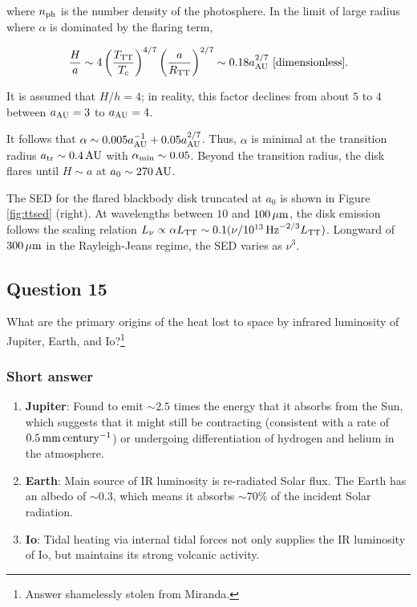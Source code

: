 \documentclass[a4paper,10pt]{article}
\begin{document}
{\noindent}where $n_{\rm ph}$ is the number density of the photosphere. In the limit of large radius where $\alpha$ is dominated by the flaring term,

\begin{align*}
    \frac{H}{a} \sim 4\left(\frac{T_{\rm TT}}{T_c}\right)^{4/7} \left(\frac{a}{R_{\rm TT}}\right)^{2/7} \sim 0.18a_{\rm AU}^{2/7} ~ [{\rm dimensionless}].
\end{align*}

{\noindent}It is assumed that $H/h=4$; in reality, this factor declines from about $5$ to $4$ between $a_{\rm AU}=3$ to $a_{\rm AU}=4$.

{\noindent}It follows that $\alpha\sim0.005a_{\rm AU}^{-1}+0.05a_{\rm AU}^{2/7}$. Thus, $\alpha$ is minimal at the transition radius $a_{\rm tr}\sim0.4\,{\rm AU}$ with $\alpha_{\rm min}\sim0.05$. Beyond the transition radius, the disk flares until $H\sim a$ at $a_0\sim270\,{\rm AU}$.

{\noindent}The SED for the flared blackbody disk truncated at $a_0$ is shown in Figure \ref{fig:ttsed} (right). At wavelengths between $10$ and $100\,\mu{\rm m}$, the disk emission follows the scaling relation $L_\nu\propto\alpha L_{\rm TT}\sim0.1(\nu/10^{13}\,{\rm Hz}^{-2/3}L_{\rm TT})$. Longward of $300\,\mu{\rm m}$ in the Rayleigh-Jeans regime, the SED varies as $\nu^3$.


\newpage
\subsection{Question 15}

What are the primary origins of the heat lost to space by infrared luminosity of Jupiter, Earth, and Io?\footnote{Answer shamelessly stolen from Miranda.}

\subsubsection{Short answer}

\begin{enumerate}
    \item \textbf{Jupiter}: Found to emit $\sim2.5$ times the energy that it absorbs from the Sun, which suggests that it might still be contracting (consistent with a rate of $0.5\,{\rm mm\,century^{-1}}$) or undergoing differentiation of hydrogen and helium in the atmosphere.
    \item \textbf{Earth}: Main source of IR luminosity is re-radiated Solar flux. The Earth has an albedo of $\sim0.3$, which means it absorbs $\sim70\%$ of the incident Solar radiation.
    \item \textbf{Io}: Tidal heating via internal tidal forces not only supplies the IR luminosity of Io, but maintains its strong volcanic activity.
\end{enumerate}
\end{document}
